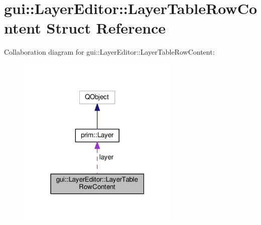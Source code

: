 \hypertarget{structgui_1_1LayerEditor_1_1LayerTableRowContent}{}\section{gui\+:\+:Layer\+Editor\+:\+:Layer\+Table\+Row\+Content Struct Reference}
\label{structgui_1_1LayerEditor_1_1LayerTableRowContent}


Collaboration diagram for gui\+:\+:Layer\+Editor\+:\+:Layer\+Table\+Row\+Content\+:\nopagebreak
\begin{figure}[H]
\begin{center}
\leavevmode
\includegraphics[width=219pt]{structgui_1_1LayerEditor_1_1LayerTableRowContent__coll__graph}
\end{center}
\end{figure}
